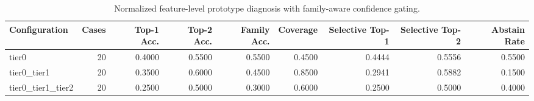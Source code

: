 \begin{table}[t]
\centering
\caption{Normalized feature-level prototype diagnosis with family-aware confidence gating.}
\label{tab:dice_stressor_hierarchical_diagnosis}
\footnotesize
\begin{tabular}{lrrrrrrrr}
\toprule
Configuration & Cases & Top-1 Acc. & Top-2 Acc. & Family Acc. & Coverage & Selective Top-1 & Selective Top-2 & Abstain Rate \\
\midrule
tier0 & 20 & 0.4000 & 0.5500 & 0.5500 & 0.4500 & 0.4444 & 0.5556 & 0.5500 \\
tier0_tier1 & 20 & 0.3500 & 0.6000 & 0.4500 & 0.8500 & 0.2941 & 0.5882 & 0.1500 \\
tier0_tier1_tier2 & 20 & 0.2500 & 0.5000 & 0.3000 & 0.6000 & 0.2500 & 0.5000 & 0.4000 \\
\bottomrule
\end{tabular}

\end{table}
